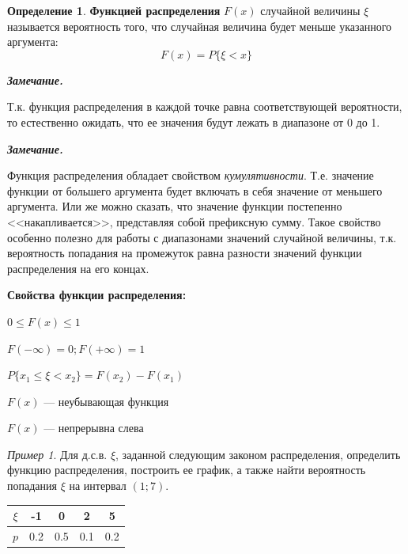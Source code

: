 \documentclass[12pt,a4paper]{article}
\newcommand{\deglistwithtitle}[2]{%
    \noindent\textbf{#1}\par\vspace{0.3em}
    \begin{deglist}
        #2
    \end{deglist}
}
\theoremstyle{definition}
\newtheorem{definition}{Определение}[section]
\theoremstyle{definition}
\theoremstyle{remark}
\newenvironment{remark}{
  \par\noindent\textbf{\textit{Замечание.}}~
}{\par}
\theoremstyle{corollary}
\newcommand{\nextblock}{\vspace{1.5em}\noindent}
\theoremstyle{bolditalic}
\newtheorem{example}{Пример}[section]
\begin{document}
\begin{definition}
    \textbf{Функцией распределения} $F(x)$ случайной величины $\xi$ называется вероятность того, что случайная величина будет меньше указанного аргумента:
    \[
    F(x)=P\{\xi<x\}
    \]
\end{definition}

\begin{remark}
    Т.к. функция распределения в каждой точке равна соответствующей вероятности, то естественно ожидать, что ее значения будут лежать в диапазоне от 0 до 1.
\end{remark}

\begin{remark}
    Функция распределения обладает свойством \textit{кумулятивности}. Т.е. значение функции от большего аргумента будет включать в себя значение от меньшего аргумента. Или же можно сказать, что значение функции постепенно <<накапливается>>, представляя собой префиксную сумму. Такое свойство особенно полезно для работы с диапазонами значений случайной величины, т.к. вероятность попадания на промежуток равна разности значений функции распределения на его концах.
\end{remark}

\nextblock

\deglistwithtitle{Свойства функции распределения:}{
    \item $0 \le F(x) \le 1$
    \item $F(-\infty)=0; F(+\infty)=1$
    \item $P\{x_1 \le \xi < x_2\} = F(x_2) - F(x_1)$
    \item $F(x)$ --- неубывающая функция
    \item $F(x)$ --- непрерывна слева
}

\begin{example}
     Для д.с.в. $\xi$, заданной следующим законом распределения, определить функцию распределения, построить ее график, а также найти вероятность попадания $\xi$ на интервал $(1;7)$.\\
    
    \centering
    \begin{tabular}{|c|c|c|c|c|}
    \hline
    $\xi$ & -1 & 0 & 2 & 5 \\
    \hline
    $p$ & 0.2 & 0.5 & 0.1 & 0.2 \\
    \hline
    \end{tabular}\\
\end{example}
\end{document}
